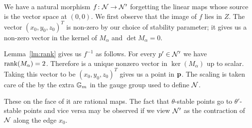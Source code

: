 \documentclass{amsart}
\theoremstyle{definition}
\begin{document}
We have a natural morphism $f \colon \mathcal{N} \rightarrow \mathcal{N}'$ forgetting the linear maps whose source is the vector space at $(0,0)$.
We first observe that the image of $f$ lies in $Z$.
The vector $(x_0, y_0, z_0)^T$ is non-zero by our choice of stability parameter; it gives us a non-zero vector in the kernel of $M_\alpha$ and $\det M_\alpha = 0$.

Lemma~\ref{lm:rank} gives us $f^{-1}$ as follows. 
For every $p' \in \mathcal{N}'$ we have $\operatorname{rank}(M_\alpha)=2$.
Therefore is a unique nonzero vector in $\ker(M_\alpha)$ up to scalar.
Taking this vector to be $(x_0, y_0, z_0)^T$ gives us a point in $\mathbf{p}$.
The scaling is taken care of the by the extra $\mathbb{G}_m$ in the gauge group used to define $\mathcal{N}$.

These on the face of it are rational maps.
The fact that $\theta$-stable points go to $\theta'$-stable points and vice versa may be observed if we view $\mathcal{N}'$ as the contraction of $\mathcal{N}$ along the edge $x_0$.
\end{document}

